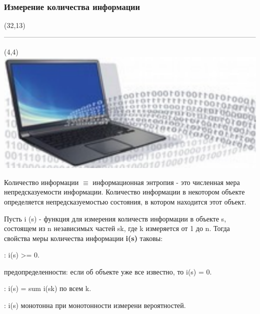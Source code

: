 \documentclass[aspectratio=169, 11pt]{beamer}
\begin{document}
	
	\begin{frame}
		\frametitle{\textbf{\textcolor[rgb]{0.4,0.4,0.4}{\textcolor[rgb]{0,0,1}{И}змерение количества информации}}}
		
\begin{textblock}{50}(32,13)
	\includegraphics[scale=0.4]{Screenshot_1.png}
\end{textblock}
		
		\begin{textblock}{50}(4,4)
			\includegraphics[scale=0.25]{Screenshot_2.png}
		\end{textblock}
	
		\textcolor[rgb]{0,0.64,0.09}{Количество информации $\equiv$ информационная энтропия} - это численная мера непредсказуемости информации. Количество информации в некотором объекте определяется непредсказуемостью состояния, в котором находится этот объект.
		\vspace{4mm}
		
		Пусть i (s) -  функция для измерения количеств информации в объекте s, состоящем из n независимых частей sk, где k  измеряется от 1 до n. \textcolor[rgb]{0,0.64,0.09}{Тогда свойства меры количества информации} \textbf{i(s)} таковы:
		\begin{itemize}
		: i(s) >= 0.
		
		 предопределенности: если об объекте уже все известно, то i(s) = 0.
		
		: i(s) = sum i(sk) по всем k.
		
		: i(s) монотонна при монотонности измерени вероятностей.
		\end{itemize}
		\end{frame}
	
\end{document}
